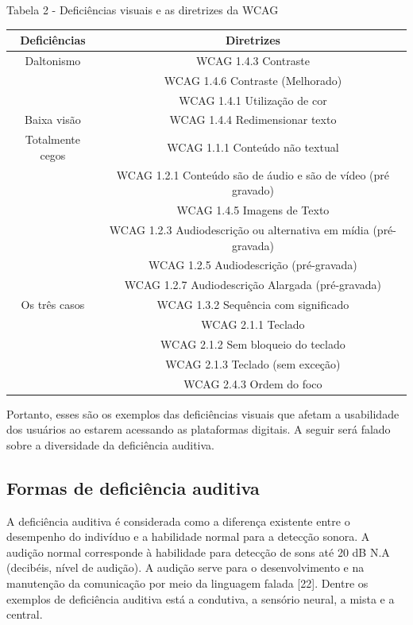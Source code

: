 \documentclass[a4paper]{article}
\begin{document}
\begin{titlepage}
Tabela 2 - Deficiências visuais e as diretrizes da WCAG\\[-1cm]
\begin{center}
	\begin{longtable}{|c|c|}
		\hline
		Deficiências & Diretrizes\\
		\hline
		Daltonismo & WCAG 1.4.3 Contraste\\
		& WCAG 1.4.6 Contraste (Melhorado)\\
		& WCAG 1.4.1 Utilização de cor\\
		\hline
		Baixa visão & WCAG 1.4.4 Redimensionar texto\\
		\hline
		Totalmente cegos & WCAG 1.1.1 Conteúdo não textual\\
		& WCAG 1.2.1 Conteúdo são de áudio e são de vídeo (pré gravado)\\
		& WCAG 1.4.5 Imagens de Texto\\
		& WCAG 1.2.3 Audiodescrição ou alternativa em mídia (pré-gravada)\\
		& WCAG 1.2.5 Audiodescrição (pré-gravada)\\
		& WCAG 1.2.7 Audiodescrição Alargada (pré-gravada)\\
		\hline
		Os três casos & WCAG 1.3.2 Sequência com significado\\
		& WCAG 2.1.1 Teclado\\ 
		& WCAG 2.1.2 Sem bloqueio do teclado\\
		& WCAG 2.1.3 Teclado (sem exceção)\\
		& WCAG 2.4.3 Ordem do foco\\
		\hline
	\end{longtable}
\end{center}

Portanto, esses são os exemplos das deficiências visuais que afetam a usabilidade dos usuários ao estarem acessando as plataformas digitais. A seguir será falado sobre a diversidade da deficiência auditiva.

\subsection{Formas de deficiência auditiva}
A deficiência auditiva é considerada como a diferença existente entre o desempenho do indivíduo e a habilidade normal para a detecção sonora. A audição normal corresponde à habilidade para detecção de sons até 20 dB N.A (decibéis, nível de audição). A audição serve para o desenvolvimento e na manutenção da comunicação por meio da linguagem falada [22]. Dentre os exemplos de deficiência auditiva está a condutiva, a sensório neural, a mista e a central.


\end{titlepage}
\end{document}
